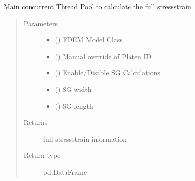 \documentclass[letterpaper,10pt,english]{sphinxmanual}
\begin{document}
\begin{fulllineitems}
\label{\detokenize{openfdem:openfdem.complete_UCS_thread_pool_generators.main}}
Main concurrent Thread Pool to calculate the full stress\sphinxhyphen{}strain
\begin{quote}\begin{description}
\item[{Parameters}] \leavevmode\begin{itemize}
\item {} 
 ({\hyperref[\detokenize{openfdem:openfdem.openfdem.Model}]{}}) \textendash{} FDEM Model Class

\item {} 
 () \textendash{} Manual override of Platen ID

\item {} 
 () \textendash{} Enable/Disable SG Calculations

\item {} 
 () \textendash{} SG width

\item {} 
 () \textendash{} SG length

\end{itemize}

\item[{Returns}] \leavevmode
full stress\sphinxhyphen{}strain information

\item[{Return type}] \leavevmode
pd.DataFrame

\end{description}\end{quote}

\end{fulllineitems}
\end{document}

